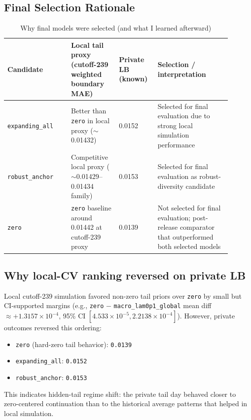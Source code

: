 \subsection{Final Selection Rationale}
\begin{table}[htbp]
\centering
\scriptsize
\caption{Why final models were selected (and what I learned afterward)}
\begin{tabular}{p{0.26\linewidth} p{0.19\linewidth} p{0.15\linewidth} p{0.30\linewidth}}
\toprule
Candidate & Local tail proxy (cutoff-239 weighted boundary MAE) & Private LB (known) & Selection / interpretation \\
\midrule
\texttt{expanding\_all} & Better than \texttt{zero} in local proxy ($\sim$0.01432) & 0.0152 & Selected for final evaluation due to strong local simulation performance \\
\texttt{robust\_anchor} & Competitive local proxy ($\sim$0.01429--0.01434 family) & 0.0153 & Selected for final evaluation as robust-diversity candidate \\
\texttt{zero} & \texttt{zero} baseline around 0.01442 at cutoff-239 proxy & 0.0139 & Not selected for final evaluation; post-release comparator that outperformed both selected models \\
\bottomrule
\end{tabular}
\end{table}

\subsection{Why local-CV ranking reversed on private LB}
Local cutoff-239 simulation favored non-zero tail priors over \texttt{zero} by small but CI-supported margins (e.g., \texttt{zero} $-$ \texttt{macro\_lam0p1\_global} mean diff $\approx +1.3157\times10^{-4}$, 95\% CI $[4.533\times10^{-5}, 2.2138\times10^{-4}]$). However, private outcomes reversed this ordering:
\begin{itemize}[leftmargin=1.5em]
  \item \texttt{zero} (hard-zero tail behavior): \texttt{0.0139}
  \item \texttt{expanding\_all}: \texttt{0.0152}
  \item \texttt{robust\_anchor}: \texttt{0.0153}
\end{itemize}
This indicates hidden-tail regime shift: the private tail day behaved closer to zero-centered continuation than to the historical average patterns that helped in local simulation.

